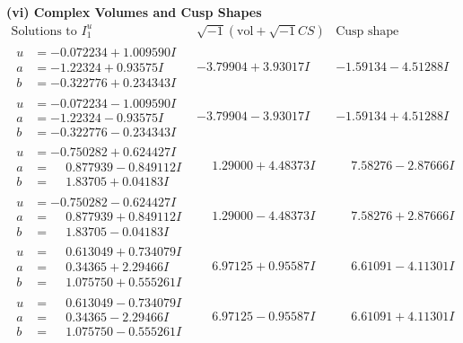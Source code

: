 \documentclass[1p]{elsarticle_modified}
\theoremstyle{definition}
\newcommand{\I}{\sqrt{-1}}
\begin{document}
\newpage\flushleft \textbf{(vi) Complex Volumes and Cusp Shapes}
$$\begin{array}{c|c|c}  
\text{Solutions to }I^u_{1}& \I (\text{vol} + \sqrt{-1}CS) & \text{Cusp shape}\\
 \hline 
\begin{aligned}
u &= -0.072234 + 1.009590 I \\
a &= -1.22324 + 0.93575 I \\
b &= -0.322776 + 0.234343 I\end{aligned}
 & -3.79904 + 3.93017 I & -1.59134 - 4.51288 I \\ \hline\begin{aligned}
u &= -0.072234 - 1.009590 I \\
a &= -1.22324 - 0.93575 I \\
b &= -0.322776 - 0.234343 I\end{aligned}
 & -3.79904 - 3.93017 I & -1.59134 + 4.51288 I \\ \hline\begin{aligned}
u &= -0.750282 + 0.624427 I \\
a &= \phantom{-}0.877939 - 0.849112 I \\
b &= \phantom{-}1.83705 + 0.04183 I\end{aligned}
 & \phantom{-}1.29000 + 4.48373 I & \phantom{-}7.58276 - 2.87666 I \\ \hline\begin{aligned}
u &= -0.750282 - 0.624427 I \\
a &= \phantom{-}0.877939 + 0.849112 I \\
b &= \phantom{-}1.83705 - 0.04183 I\end{aligned}
 & \phantom{-}1.29000 - 4.48373 I & \phantom{-}7.58276 + 2.87666 I \\ \hline\begin{aligned}
u &= \phantom{-}0.613049 + 0.734079 I \\
a &= \phantom{-}0.34365 + 2.29466 I \\
b &= \phantom{-}1.075750 + 0.555261 I\end{aligned}
 & \phantom{-}6.97125 + 0.95587 I & \phantom{-}6.61091 - 4.11301 I \\ \hline\begin{aligned}
u &= \phantom{-}0.613049 - 0.734079 I \\
a &= \phantom{-}0.34365 - 2.29466 I \\
b &= \phantom{-}1.075750 - 0.555261 I\end{aligned}
 & \phantom{-}6.97125 - 0.95587 I & \phantom{-}6.61091 + 4.11301 I \\ \hline\begin{aligned}

\end{aligned}
\end{array}$$
\end{document}
